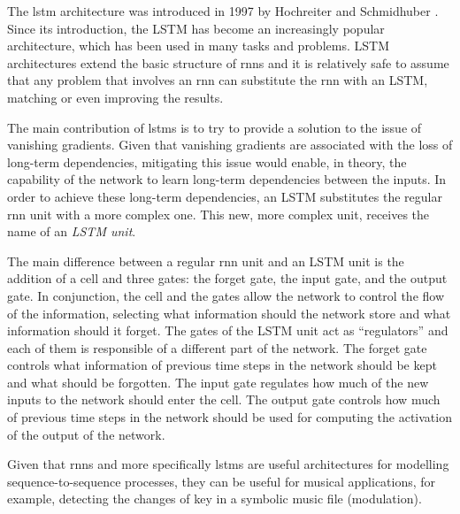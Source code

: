 

The \gls{lstm} architecture was
introduced in 1997 by Hochreiter and Schmidhuber
\parencite{hochreiter1997long}. Since its introduction, the
LSTM has become an increasingly popular architecture, which
has been used in many tasks and problems. LSTM architectures
extend the basic structure of \glspl{rnn} and it is relatively safe
to assume that any problem that involves an \gls{rnn} can
substitute the \gls{rnn} with an LSTM, matching or even improving
the results.

The main contribution of \glspl{lstm} is to try to provide a
solution to the issue of vanishing gradients. Given that
vanishing gradients are associated with the loss of
long-term dependencies, mitigating this issue would enable,
in theory, the capability of the network to learn long-term
dependencies between the inputs. In order to achieve these
long-term dependencies, an LSTM substitutes the regular \gls{rnn}
unit with a more complex one. This new, more complex unit,
receives the name of an \emph{LSTM unit}.

The main difference between a regular \gls{rnn} unit and an LSTM
unit is the addition of a cell and three gates: the forget
gate, the input gate, and the output gate. In conjunction,
the cell and the gates allow the network to control the flow
of the information, selecting what information should the
network store and what information should it forget. The
gates of the LSTM unit act as ``regulators'' and each of
them is responsible of a different part of the network. The
forget gate controls what information of previous time steps
in the network should be kept and what should be forgotten.
The input gate regulates how much of the new inputs to the
network should enter the cell. The output gate controls how
much of previous time steps in the network should be used
for computing the activation of the output of the network.

Given that \glspl{rnn} and more specifically \glspl{lstm} are useful
architectures for modelling sequence-to-sequence processes,
they can be useful for musical applications, for example,
detecting the changes of key in a symbolic music file
(modulation).


